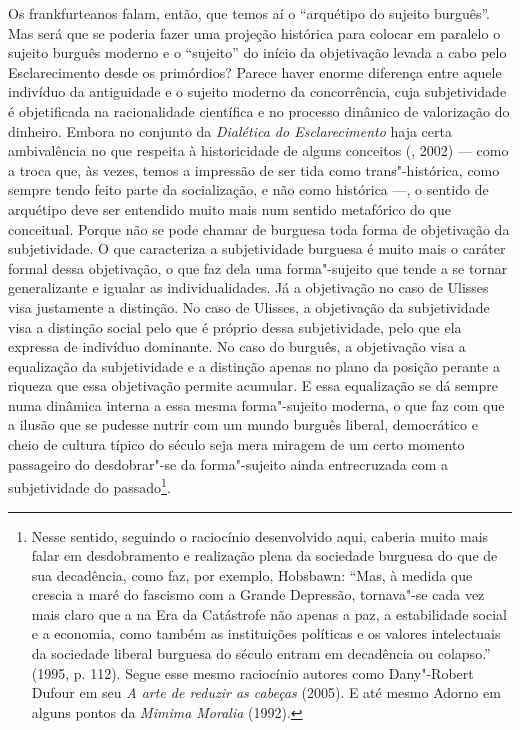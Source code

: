 Os frankfurteanos falam, então, que temos aí o ``arquétipo do sujeito
burguês''. Mas será que se poderia fazer uma projeção histórica para
colocar em paralelo o sujeito burguês moderno e o ``sujeito'' do início
da objetivação levada a cabo pelo Esclarecimento desde os primórdios?
Parece haver enorme diferença entre aquele indivíduo da antiguidade e o
sujeito moderno da concorrência, cuja subjetividade é objetificada na
racionalidade científica e no processo dinâmico de valorização do
dinheiro. Embora no conjunto da \emph{Dialética do Esclarecimento} haja
certa ambivalência no que respeita à historicidade de alguns conceitos
(, 2002) --- como a troca que, às vezes, temos a impressão de ser
tida como trans"-histórica, como sempre tendo feito parte da
socialização, e não como histórica ---, o sentido de arquétipo deve ser
entendido muito mais num sentido metafórico do que conceitual. Porque
não se pode chamar de burguesa toda forma de objetivação da
subjetividade. O que caracteriza a subjetividade burguesa é muito mais o
caráter formal dessa objetivação, o que faz dela uma forma"-sujeito que
tende a se tornar generalizante e igualar as individualidades. Já a
objetivação no caso de Ulisses visa justamente a distinção. No
caso de Ulisses, a objetivação da subjetividade visa a distinção social
pelo que é próprio dessa subjetividade, pelo que ela expressa de
indivíduo dominante. No caso do burguês, a objetivação visa a
equalização da subjetividade e a distinção apenas no plano da posição
perante a riqueza que essa objetivação permite acumular. E essa
equalização se dá sempre numa dinâmica interna a essa mesma
forma"-sujeito moderna, o que faz com que a ilusão que se pudesse nutrir
com um mundo burguês liberal, democrático e cheio de cultura típico do
século  seja mera miragem de um certo momento passageiro do
desdobrar"-se da forma"-sujeito ainda entrecruzada com a subjetividade do
passado\footnote{Nesse sentido, seguindo o raciocínio desenvolvido aqui,
  caberia muito mais falar em desdobramento e realização plena da
  sociedade burguesa do que de sua decadência, como faz, por exemplo,
  Hobsbawn: ``Mas, à medida que crescia a maré do fascismo com a Grande
  Depressão, tornava"-se cada vez mais claro que a na Era da Catástrofe
  não apenas a paz, a estabilidade social e a economia, como também as
  instituições políticas e os valores intelectuais da sociedade liberal
  burguesa do século  entram em decadência ou colapso.'' (1995, p.
  112). Segue esse mesmo raciocínio autores como Dany"-Robert Dufour em
  seu \emph{A arte de reduzir as cabeças} (2005). E até mesmo
  Adorno em alguns pontos da \emph{Mimima Moralia} (1992).}.

